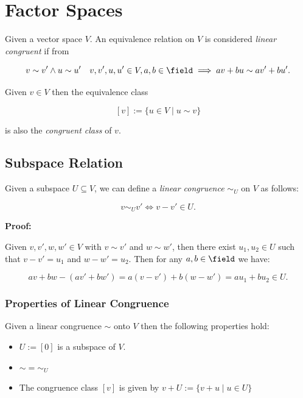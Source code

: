 \chapter{Factor Spaces}

Given a vector space \(V\). An equivalence relation on \(V\) is considered 
\emph{linear congruent} if from

\[
    v \sim v' \land u \sim u' \quad v,v',u,u' \in V, a,b \in \field \implies av + bu \sim av' + bu'.
\]

Given \(v \in V\) then the equivalence class 

\[
    [v] := \{u \in V \mid u \sim v\}
\]

is also the \emph{congruent class} of \(v\).

\section{Subspace Relation}

Given a subspace \(U \subseteq V\), we can define a \emph{linear congruence} \(\sim_U\) on \(V\) as follows:  

\[
    v \sim_U v' \iff v - v' \in U.
\]  

\textbf{Proof:}

Given \(v, v', w, w' \in V\) with \(v \sim v'\) and \(w \sim w'\), then there exist \(u_1, u_2 \in U\) 
such that \(v - v' = u_1\) and \(w - w' = u_2\). Then for any \(a, b \in \field\) we have: 

\[
    av + bw - (av' + bw') = a(v - v') + b(w - w') = au_1 + bu_2 \in U.
\]

\QED 

\subsection{Properties of Linear Congruence}

Given a linear congruence \(\sim\) onto \(V\) then the following properties hold: 

\begin{itemize}

    \item \(U := [0]\) is a subspace of \(V\). 

    \item \(\sim = \sim_U\)

    \item The congruence class \([v]\) is given by \(v + U := \{v + u \mid u \in U\}\)

\end{itemize}

